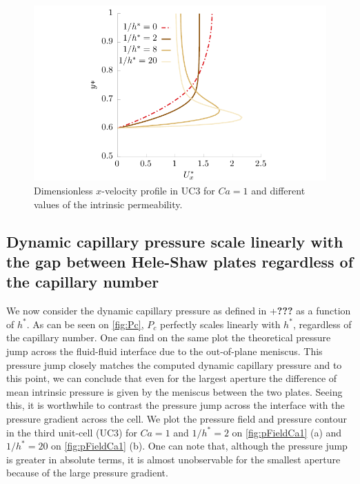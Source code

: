 \documentclass[]{article}
\begin{document}
\begin{figure}
\hypertarget{fig:uprofileCa1}{%
\centering
\includegraphics{figures/pdf/uprofileCa1.pdf}
\caption{Dimensionless \(x\)-velocity profile in UC3 for \(Ca=1\) and
different values of the intrinsic permeability.}\label{fig:uprofileCa1}
}
\end{figure}

\hypertarget{dynamic-capillary-pressure-scale-linearly-with-the-gap-between-hele-shaw-plates-regardless-of-the-capillary-number}{%
\subsection{Dynamic capillary pressure scale linearly with the gap
between Hele-Shaw plates regardless of the capillary
number}\label{dynamic-capillary-pressure-scale-linearly-with-the-gap-between-hele-shaw-plates-regardless-of-the-capillary-number}}

We now consider the dynamic capillary pressure as defined in
+\textbf{???} as a function of \(h^*\). As can be seen on \cref{fig:Pc},
\(P_c\) perfectly scales linearly with \(h^*\), regardless of the
capillary number. One can find on the same plot the theoretical pressure
jump across the fluid-fluid interface due to the out-of-plane meniscus.
This pressure jump closely matches the computed dynamic capillary
pressure and to this point, we can conclude that even for the largest
aperture the difference of mean intrinsic pressure is given by the
meniscus between the two plates. Seeing this, it is worthwhile to
contrast the pressure jump across the interface with the pressure
gradient across the cell. We plot the pressure field and pressure
contour in the third unit-cell (UC3) for \(Ca=1\) and \(1/h^*=2\) on
\cref{fig:pFieldCa1} (a) and \(1/h^*=20\) on \cref{fig:pFieldCa1} (b).
One can note that, although the pressure jump is greater in absolute
terms, it is almost unobservable for the smallest aperture because of
the large pressure gradient.
\end{document}
